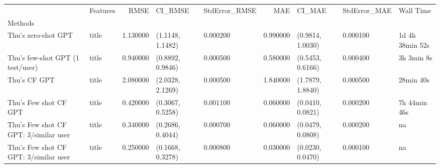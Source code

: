 \begin{tabular}{llrllrlll}
 & Features & RMSE & CI_RMSE & StdError_RMSE & MAE & CI_MAE & StdError_MAE & Wall Time \\
Methods &  &  &  &  &  &  &  &  \\
Thu's zero-shot GPT & title & 1.130000 & (1.1148, 1.1482) & 0.000200 & 0.990000 & (0.9814, 1.0030) & 0.000100 & 1d 4h 38min 52s \\
Thu's few-shot GPT (1 test/user) & title & 0.940000 & (0.8892, 0.9846) & 0.000500 & 0.580000 & (0.5453, 0.6166) & 0.000400 & 3h 3min 8s \\
Thu's CF GPT & title & 2.080000 & (2.0328, 2.1269) & 0.000500 & 1.840000 & (1.7879, 1.8840) & 0.000500 & 28min 40s \\
Thu's Few shot CF GPT & title & 0.420000 & (0.3067, 0.5258) & 0.001100 & 0.060000 & (0.0410, 0.0821) & 0.000200 & 7h 44min 46s \\
Thu's Few shot CF GPT: 3/similar user & title & 0.340000 & (0.2686, 0.4044) & 0.000700 & 0.060000 & (0.0479, 0.0808) & 0.000200 & na \\
Thu's Few shot CF GPT: 3/similar user & title & 0.250000 & (0.1668, 0.3278) & 0.000800 & 0.030000 & (0.0230, 0.0470) & 0.000100 & na \\
\end{tabular}
